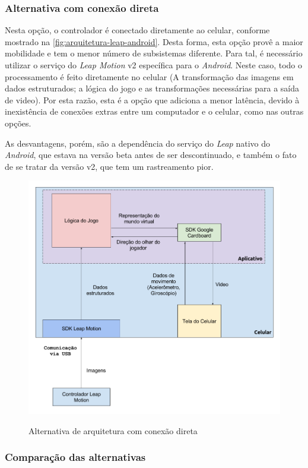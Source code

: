 \subsubsection{Alternativa com conexão direta}\label{subsubsec-arquiteturas-leapmotion-android}

Nesta opção, o controlador é conectado diretamente ao celular, conforme 
mostrado na \autoref{fig:arquitetura-leap-android}. Desta forma, esta opção 
provê a maior mobilidade e tem o menor número de subsistemas diferente. Para 
tal, é necessário utilizar o serviço do \textit{Leap Motion} v2 específica para 
o \textit{Android}. Neste caso, todo o processamento é feito diretamente no 
celular (A transformação das imagens em dados estruturados; a lógica do jogo e 
as transformações necessárias para a saída de video). Por esta razão, esta é a 
opção que adiciona a menor latência, devido à inexistência de conexões extras 
entre um computador e o celular, como nas outras opções.

As desvantagens, porém, são a dependência do serviço do \textit{Leap} nativo 
do \textit{Android}, que estava na versão beta antes de ser descontinuado, e 
também o fato de se tratar da versão v2, que tem um rastreamento pior.

\begin{figure}
	\centering
	\caption{Alternativa de arquitetura com conexão direta}
	\includegraphics[width=0.7\linewidth]{images/Arquitetura-leap-android}
	\legend{\fonteAP}
	\label{fig:arquitetura-leap-android}
\end{figure}

\subsubsection{Comparação das alternativas}\label{subsubsec-arquiteturas-comparacao}

